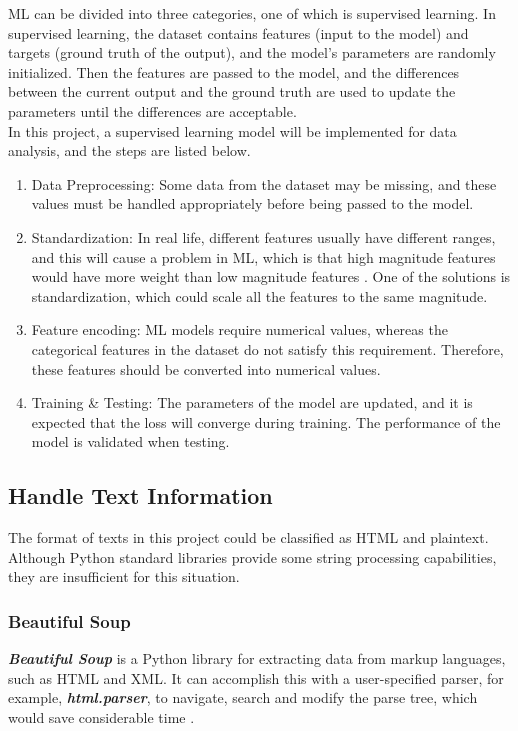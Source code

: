 \documentclass[12pt,twoside]{report}
\begin{document}
ML can be divided into three categories, one of which is supervised learning. In supervised learning, the dataset contains features (input to the model) and targets (ground truth of the output), and the model's parameters are randomly initialized. Then the features are passed to the model, and the differences between the current output and the ground truth are used to update the parameters until the differences are acceptable. 
\\

In this project, a supervised learning model will be implemented for data analysis, and the steps are listed below.
\begin{enumerate}
	\item Data Preprocessing: Some data from the dataset may be missing, and these values must be handled appropriately before being passed to the model. 
	\item Standardization: In real life, different features usually have different ranges, and this will cause a problem in ML, which is that high magnitude features would have more weight than low magnitude features \citep{RN4}. One of the solutions is standardization, which could scale all the features to the same magnitude.
	\item Feature encoding: ML models require numerical values, whereas the categorical features in the dataset do not satisfy this requirement. Therefore, these features should be converted into numerical values. 
	\item Training \& Testing: The parameters of the model are updated, and it is expected that the loss will converge during training. The performance of the model is validated when testing.
\end{enumerate}

\subsection{Handle Text Information}
The format of texts in this project could be classified as HTML and plaintext. Although Python standard libraries provide some string processing capabilities, they are insufficient for this situation. 

\subsubsection{Beautiful Soup}
\textit{\textbf{Beautiful Soup}} is a Python library for extracting data from markup languages, such as HTML and XML. It can accomplish this with a user-specified parser, for example, \textbf{\textit{html.parser}}, to navigate, search and modify the parse tree, which would save considerable time \citep{RN10}. 
\end{document}
